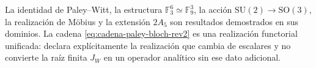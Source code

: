 \begin{statusbox}[title={Procedencia y alcance de la cadena proyectiva}]
La identidad de Paley--Witt, la estructura
\(\mathbb F_3^6\simeq\mathbb F_9^3\), la acción
\(\mathrm{SU}(2)\to\mathrm{SO}(3)\), la realización de Möbius y la extensión
\(2A_5\) son resultados demostrados en sus dominios. La cadena
\eqref{eq:cadena-paley-bloch-rev2} es una realización functorial unificada:
declara explícitamente la realización que cambia de escalares y no convierte
la raíz finita \(J_W\) en un operador analítico sin ese dato adicional.
\end{statusbox}
